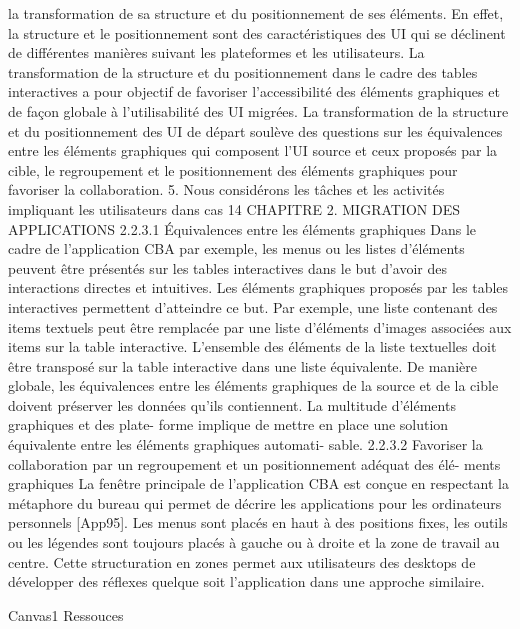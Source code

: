 \documentclass{article}
\begin{document}
la transformation de sa structure et du positionnement de ses éléments. En effet, la structure et le
positionnement sont des caractéristiques des UI qui se déclinent de différentes manières suivant les
plateformes et les utilisateurs. La transformation de la structure et du positionnement dans le cadre
des tables interactives a pour objectif de favoriser l’accessibilité des éléments graphiques et de façon
globale à l’utilisabilité des UI migrées.
La transformation de la structure et du positionnement des UI de départ soulève des questions
sur les équivalences entre les éléments graphiques qui composent l’UI source et ceux proposés par la
cible, le regroupement et le positionnement des éléments graphiques pour favoriser la collaboration.
5. Nous considérons les tâches et les activités impliquant les utilisateurs dans cas
14
CHAPITRE 2. MIGRATION DES APPLICATIONS
2.2.3.1
Équivalences entre les éléments graphiques
Dans le cadre de l’application CBA par exemple, les menus ou les listes d’éléments peuvent
être présentés sur les tables interactives dans le but d’avoir des interactions directes et intuitives. Les
éléments graphiques proposés par les tables interactives permettent d’atteindre ce but. Par exemple,
une liste contenant des items textuels peut être remplacée par une liste d’éléments d’images associées
aux items sur la table interactive. L’ensemble des éléments de la liste textuelles doit être transposé sur
la table interactive dans une liste équivalente.
De manière globale, les équivalences entre les éléments graphiques de la source et de la cible
doivent préserver les données qu’ils contiennent. La multitude d’éléments graphiques et des plate-
forme implique de mettre en place une solution équivalente entre les éléments graphiques automati-
sable.
2.2.3.2
Favoriser la collaboration par un regroupement et un positionnement adéquat des élé-
ments graphiques
La fenêtre principale de l’application CBA est conçue en respectant la métaphore du bureau qui
permet de décrire les applications pour les ordinateurs personnels [App95]. Les menus sont placés en
haut à des positions ﬁxes, les outils ou les légendes sont toujours placés à gauche ou à droite et la zone
de travail au centre. Cette structuration en zones permet aux utilisateurs des desktops de développer
des réﬂexes quelque soit l’application dans une approche similaire.
 
Canvas1
Ressouces
 
\end{document}
